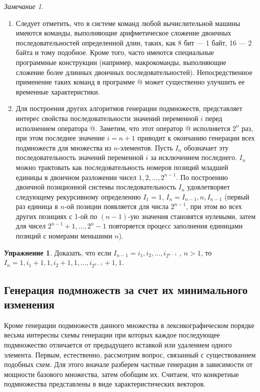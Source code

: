 \documentclass[12pt,a4paper]{article}
\theoremstyle{plain}
\theoremstyle{definition}
\newtheorem*{task}{Упражнение}
\theoremstyle{remark}
\newtheorem*{remark}{Замечание}
\begin{document}
\begin{remark}
~\\
\begin{enumerate}
\item Следует отметить, что в системе команд любой вычислительной машины имеются команды, выполняющие арифметическое сложение двоичных последовательностей определенной длин, таких, как 8 бит --- 1 байт, 16 --- 2 байта и тому подобное. Кроме того, часто имеются специальные программные конструкции (например, макрокоманды, выполняющие сложение более длинных двоичных последовательностей). Непосредственное применение таких команд в программе @ может существенно улучшить ее временные характеристики.
\item Для построения других алгоритмов генерации подмножеств, представляет интерес свойства последовательности значений переменной $i$ перед исполнением оператора \verb@{*}@. Заметим, что этот оператор \verb@{*}@ исполняется $2^n$ раз, при этом последнее значение $i=n+1$ приводит к окончанию генерации всех подмножеств для множества из $n$-элементов. Пусть $I_n$ обозначает эту последовательность значений переменной $i$ за исключением последнего. $I_n$ можно трактовать как последовательность номеров позиций младшей единицы в двоичном разложении чисел $1, 2,\ldots, 2^{n-1}$. По построению двоичной позиционной системы последовательность $I_n$ удовлетворяет следующему рекурсивному определению $I_1=1$, $I_n = I_{n-1},n,I_{n-1}$ (первый раз единица в $n$-ой позиции появляется для числа $2^{n-1}$, при этом во всех других позициях с 1-ой по $(n-1)$-ую значения становятся нулевыми, затем для чисел $2^{n-1}+1,\ldots,2^{n}-1$ повторяется процесс заполнения единицами позиций с номерами меньшими $n$).
\end{enumerate}
\end{remark}

\begin{task}
Доказать, что если $I_{n-1}=i_1, i_2, \ldots, i_{2^{n-1}}$ , $n>1$, то $I_n=1, i_1+1, 1, i_2+1, 1, \ldots, i_{2^{n-1}} + 1, 1$.
\end{task}

\subsection{Генерация подмножеств за счет их минимального изменения}

Кроме генерации подмножеств данного множества в лексикографическом порядке весьма интересны схемы генерации при которых каждое последующее подмножество отличается от предыдущего вставкой или удалением одного элемента. Первым, естественно, рассмотрим вопрос, связанный с существованием подобных схем. Для этого вначале разберем частные генерации в зависимости от мощности базового множества, затем обобщим их. Считаем, что конкретные подмножества представлены в виде характеристических векторов.
\end{document}
